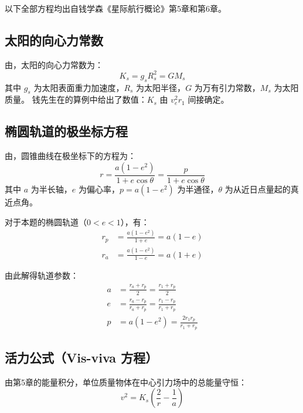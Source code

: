 \documentclass[12pt,a4paper]{ctexart}
\begin{document}
以下全部方程均出自钱学森《星际航行概论》\cite{qian2008}第5章和第6章。

\subsection{太阳的向心力常数}

由\cite[\S6.1, pp.~117]{qian2008}，太阳的向心力常数为：
\begin{equation}\label{eq:K}
    K_s = g_s R_s^2 = GM_s
\end{equation}
其中 $g_s$ 为太阳表面重力加速度，$R_s$ 为太阳半径，$G$ 为万有引力常数，$M_s$ 为太阳质量。
钱先生在\cite[\S6.3]{qian2008}的算例中给出了数值：$K_s$ 由 $v_e^2 r_1$ 间接确定。

\subsection{椭圆轨道的极坐标方程}

由\cite[第5章, 式(5.9)]{qian2008}，圆锥曲线在极坐标下的方程为：
\begin{equation}\label{eq:conic}
    r = \frac{a(1-e^2)}{1 + e\cos\theta} = \frac{p}{1 + e\cos\theta}
\end{equation}
其中 $a$ 为半长轴，$e$ 为偏心率，$p = a(1-e^2)$ 为半通径，$\theta$ 为从近日点量起的真近点角。

对于本题的椭圆轨道（$0 < e < 1$），有：
\begin{align}
    r_p &= \frac{a(1-e^2)}{1+e} = a(1-e) \label{eq:rp} \\
    r_a &= \frac{a(1-e^2)}{1-e} = a(1+e) \label{eq:ra}
\end{align}

由此解得轨道参数：
\begin{align}
    a &= \frac{r_a + r_p}{2} = \frac{r_1 + r_p}{2} \label{eq:a} \\
    e &= \frac{r_a - r_p}{r_a + r_p} = \frac{r_1 - r_p}{r_1 + r_p} \label{eq:e} \\[4pt]
    p &= a(1-e^2) = \frac{2r_1 r_p}{r_1 + r_p} \label{eq:p}
\end{align}

\subsection{活力公式（Vis-viva 方程）}

由第5章的能量积分，单位质量物体在中心引力场中的总能量守恒：
\begin{equation}\label{eq:visviva}
    v^2 = K_s\left(\frac{2}{r} - \frac{1}{a}\right)
\end{equation}
\end{document}
